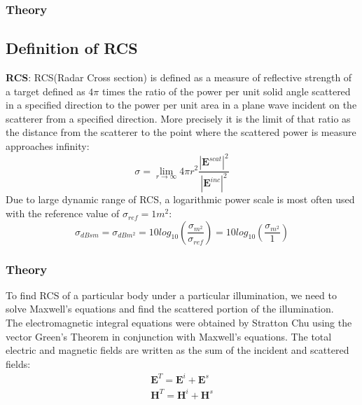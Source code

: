 \documentclass{beamer}
\begin{document}
\begin{frame}
\frametitle{Theory}
\subsection{Definition of RCS}
\textbf{RCS}: RCS(Radar Cross section) is defined as a measure of reflective strength of a target defined as $4\pi$ times the ratio of the power per unit solid angle scattered  in a specified direction to the power per unit area in a plane wave incident on the scatterer from a specified direction. More precisely it is the limit of that ratio as the distance from the scatterer to the point where the scattered power is measure approaches infinity:
\begin{equation}
\sigma = \lim_{r\to\infty} 4\pi r^2 \frac{|\textbf{E}^{scat}|^2}{|\textbf{E}^{inc}|^2}
\end{equation}
Due to large dynamic range of RCS, a logarithmic power scale is most often used with the reference value of $\sigma_{ref} = 1 m^2$:
\begin{equation}
\sigma_{dBsm} = \sigma_{dBm^2} = 10log_{10}(\frac{\sigma_{m^2}}{\sigma_{ref}}) = 10log_{10}(\frac{\sigma_{m^2}}{1})
\end{equation}
\end{frame}
\begin{frame}
\frametitle{Theory}
To find RCS of a particular body under a particular illumination, we need to solve Maxwell's equations and find the scattered portion of the illumination.\\
The electromagnetic integral equations were obtained by Stratton Chu using the vector Green's Theorem in conjunction with Maxwell's equations. The total electric and magnetic fields are written as the sum of the incident and scattered fields:
\begin{eqnarray}
\textbf{E}^T = \textbf{E}^i + \textbf{E}^s \\
\textbf{H}^T = \textbf{H}^i + \textbf{H}^s
\end{eqnarray}
\end{frame}
\end{document}
